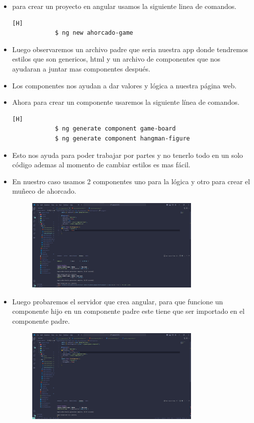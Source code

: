 \documentclass{article}
\begin{document}
\begin{itemize}
\begin{figure}[H]
		\end{figure}
		\item para crear un proyecto en angular usamos la siguiente linea de comandos.
		\begin{lstlisting}[language=bash,caption={Crear Proyecto en Angular}][H]
			$ ng new ahorcado-game
		\end{lstlisting}
		\item Luego observaremos un archivo padre que seria nuestra app donde tendremos estilos que son genericos, html y un archivo de componentes que nos ayudaran a juntar mas componentes después.
		\item Los componentes nos ayudan a dar valores y lógica a nuestra página web.
		\item Ahora para crear un componente usaremos la siguiente línea de comandos.
		\begin{lstlisting}[language=bash,caption={Crear Componentes}][H]
			$ ng generate component game-board
			$ ng generate component hangman-figure 
		\end{lstlisting}
		\item Esto nos ayuda para poder trabajar por partes y no tenerlo todo en un solo código ademas al momento de cambiar estilos es mas fácil.
		\item En nuestro caso usamos 2 componentes uno para la lógica y otro para crear el muñeco de ahorcado.
		\begin{figure}[H]
			\centering
			\includegraphics[width=0.8\textwidth,keepaspectratio]{img/creamosuncomponente.jpg}
	
		\end{figure}
		\item Luego probaremos el servidor que crea angular, para que funcione un componente hijo en un componente padre este tiene que ser importado en el componente padre.
		\begin{figure}[H]
			\centering
			\includegraphics[width=0.8\textwidth,keepaspectratio]{img/tenemosqueimportarparausarloenotrocomponente.jpg}
	

\end{figure}
\end{itemize}
\end{document}
